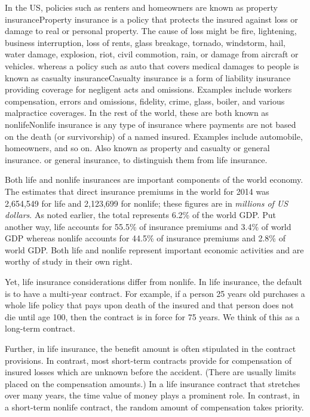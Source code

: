 \documentclass[]{book}
\theoremstyle{definition}
\theoremstyle{definition}
\theoremstyle{definition}
\theoremstyle{remark}
\begin{document}
In the US, policies such as renters and homeowners are known as property
insurance{Property insurance is a policy that protects the insured
against loss or damage to real or personal property. The cause of loss
might be fire, lightening, business interruption, loss of rents, glass
breakage, tornado, windstorm, hail, water damage, explosion, riot, civil
commotion, rain, or damage from aircraft or vehicles.} whereas a policy
such as auto that covers medical damages to people is known as casualty
insurance{Casualty insurance is a form of liability insurance providing
coverage for negligent acts and omissions. Examples include workers
compensation, errors and omissions, fidelity, crime, glass, boiler, and
various malpractice coverages.} In the rest of the world, these are both
known as nonlife{Nonlife insurance is any type of insurance where
payments are not based on the death (or survivorship) of a named
insured. Examples include automobile, homeowners, and so on. Also known
as property and casualty or general insurance.} or general insurance, to
distinguish them from life insurance.

Both life and nonlife insurances are important components of the world
economy. The \citet{III2016} estimates that direct insurance premiums in
the world for 2014 was 2,654,549 for life and 2,123,699 for nonlife;
these figures are in \emph{millions of US dollars}. As noted earlier,
the total represents 6.2\% of the world GDP. Put another way, life
accounts for 55.5\% of insurance premiums and 3.4\% of world GDP whereas
nonlife accounts for 44.5\% of insurance premiums and 2.8\% of world
GDP. Both life and nonlife represent important economic activities and
are worthy of study in their own right.

Yet, life insurance considerations differ from nonlife. In life
insurance, the default is to have a multi-year contract. For example, if
a person 25 years old purchases a whole life policy that pays upon death
of the insured and that person does not die until age 100, then the
contract is in force for 75 years. We think of this as a long-term
contract.

Further, in life insurance, the benefit amount is often stipulated in
the contract provisions. In contrast, most short-term contracts provide
for compensation of insured losses which are unknown before the
accident. (There are usually limits placed on the compensation amounts.)
In a life insurance contract that stretches over many years, the time
value of money plays a prominent role. In contrast, in a short-term
nonlife contract, the random amount of compensation takes priority.
\end{document}
